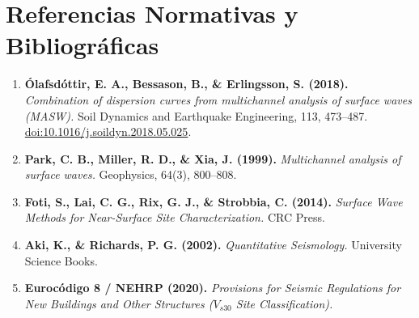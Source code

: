 \documentclass[11pt,a4paper]{article}
\begin{document}
\section{Referencias Normativas y Bibliográficas}
\begin{enumerate}
    \item \textbf{Ólafsdóttir, E. A., Bessason, B., \& Erlingsson, S. (2018).} \emph{Combination of dispersion curves from multichannel analysis of surface waves (MASW).} Soil Dynamics and Earthquake Engineering, 113, 473--487. \href{https://doi.org/10.1016/j.soildyn.2018.05.025}{doi:10.1016/j.soildyn.2018.05.025}.
    \item \textbf{Park, C. B., Miller, R. D., \& Xia, J. (1999).} \emph{Multichannel analysis of surface waves.} Geophysics, 64(3), 800--808.
    \item \textbf{Foti, S., Lai, C. G., Rix, G. J., \& Strobbia, C. (2014).} \emph{Surface Wave Methods for Near-Surface Site Characterization.} CRC Press.
    \item \textbf{Aki, K., \& Richards, P. G. (2002).} \emph{Quantitative Seismology.} University Science Books.
    \item \textbf{Eurocódigo 8 / NEHRP (2020).} \emph{Provisions for Seismic Regulations for New Buildings and Other Structures ($V_{s30}$ Site Classification).}
\end{enumerate}
\end{document}
